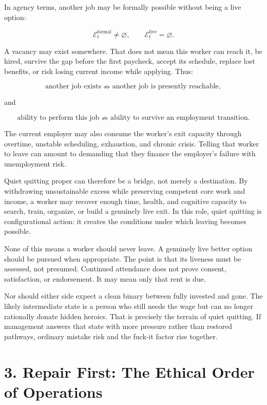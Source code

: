 \documentclass[11pt,oneside]{article}
\begin{document}
In agency terms, another job may be formally possible without being a
live option:

\[
\mathcal E_t^{\mathrm{formal}}\neq\varnothing,
\qquad
\mathcal E_t^{\mathrm{live}}=\varnothing.
\]

A vacancy may exist somewhere. That does not mean this worker can reach
it, be hired, survive the gap before the first paycheck, accept its
schedule, replace lost benefits, or risk losing current income while
applying. Thus:

\[
\text{another job exists}
\nRightarrow
\text{another job is presently reachable},
\]

and

\[
\text{ability to perform this job}
\nRightarrow
\text{ability to survive an employment transition}.
\]

The current employer may also consume the worker's exit capacity through
overtime, unstable scheduling, exhaustion, and chronic crisis. Telling
that worker to leave can amount to demanding that they finance the
employer's failure with unemployment risk.

Quiet quitting proper can therefore be a bridge, not merely a
destination. By withdrawing unsustainable excess while preserving
competent core work and income, a worker may recover enough time, health,
and cognitive capacity to search, train, organize, or build a genuinely
live exit. In this role, quiet quitting is configurational action: it
creates the conditions under which leaving becomes possible.

None of this means a worker should never leave. A genuinely live better
option should be pursued when appropriate. The point is that its
liveness must be assessed, not presumed. Continued attendance does not
prove consent, satisfaction, or endorsement. It may mean only that rent
is due.

Nor should either side expect a clean binary between fully invested and
gone. The likely intermediate state is a person who still needs the wage
but can no longer rationally donate hidden heroics. That is precisely the
terrain of quiet quitting. If management answers that state with more
pressure rather than restored pathways, ordinary mistake risk and the
fuck-it factor rise together.

\section{3. Repair First: The Ethical Order of
Operations}\label{repair-first-the-ethical-order-of-operations}
\end{document}
